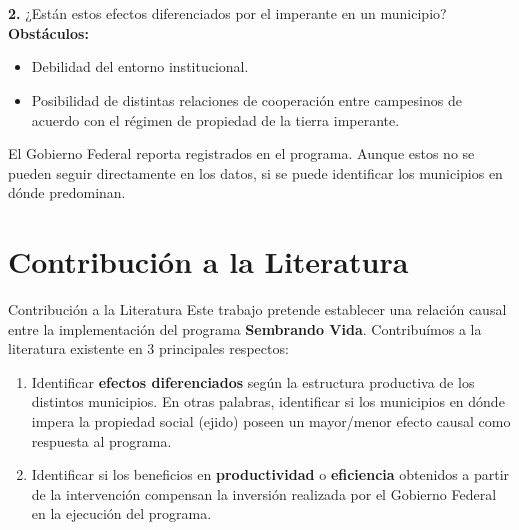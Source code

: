\documentclass[10pt,usenames,dvipsnames]{beamer}
\begin{document}
\begin{frame}
 \\
\bigskip
{} \\
\end{frame}

\begin{frame}
\textbf{\alert{2.}} ¿Están estos efectos diferenciados por el  imperante en un municipio?\\
\bigskip
\textbf{Obstáculos:}
\begin{itemize}
    \item Debilidad del entorno institucional.
    \item Posibilidad de distintas relaciones de cooperación entre campesinos de acuerdo con el régimen de propiedad de la tierra imperante.
\end{itemize}
\bigskip
El Gobierno Federal reporta  registrados en el programa. Aunque estos no se pueden seguir directamente en los datos, si se puede identificar los municipios en dónde predominan.
\end{frame}


\section{Contribución a la Literatura}

\begin{frame}{Contribución a la Literatura}
Este trabajo pretende establecer una relación causal entre la implementación del programa \textbf{Sembrando Vida}. Contribuímos a la literatura existente en 3 principales respectos:\\
\bigskip
\begin{enumerate}
\pause
\item Identificar \textbf{efectos diferenciados} según la estructura productiva de los distintos municipios. En otras palabras, identificar si los municipios en dónde impera la propiedad social (ejido) poseen un mayor/menor efecto causal como respuesta al programa.
\bigskip
\pause
\item Identificar si los beneficios en \textbf{productividad} o \textbf{eficiencia} obtenidos a partir de la intervención compensan la inversión realizada por el Gobierno Federal en la ejecución del programa.
\end{enumerate}
\end{frame}
\end{document}
